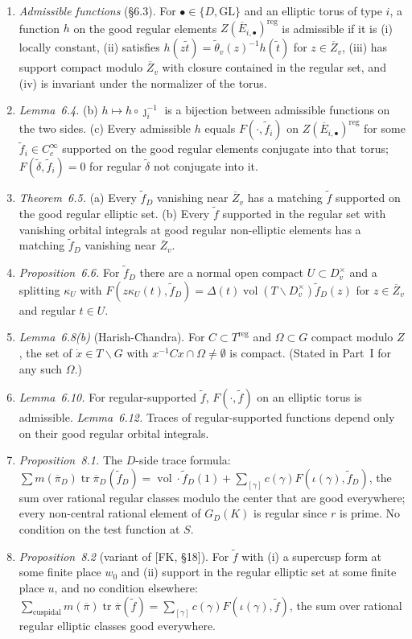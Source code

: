 \documentclass[12pt]{article}
\newcommand{\ov}[1]{\overline{#1}}
\newcommand{\reg}{\mathrm{reg}}
\newcommand{\tr}{\operatorname{tr}}
\newcommand{\vol}{\operatorname{vol}}
\newcommand{\GL}{\mathrm{GL}}
\newcommand{\Zb}{\ov{Z}}
\newcommand{\pib}{\ov{\pi}}
\newcommand{\Eb}{\ov{E}}
\newcommand{\jj}{\jmath}
\theoremstyle{plain}
\theoremstyle{definition}
\begin{document}
\begin{enumerate}[label=(I\arabic*)]
\item \emph{Admissible functions} (\S6.3). For $\bullet\in\{D,\GL\}$ and an elliptic torus of type $i$, a function $h$ on the good regular elements $Z(\Eb_{i,\bullet})^{\reg}$ is admissible if it is (i) locally constant, (ii) satisfies $h(z\tilde t)=\tilde\theta_v(z)^{-1}h(\tilde t)$ for $z\in\Zb_v$, (iii) has support compact modulo $\Zb_v$ with closure contained in the regular set, and (iv) is invariant under the normalizer of the torus.
\item \emph{Lemma~6.4.} (b) $h\mapsto h\circ\jj_i^{-1}$ is a bijection between admissible functions on the two sides. (c) Every admissible $h$ equals $F(\cdot,\tilde f_i)$ on $Z(\Eb_{i,\bullet})^{\reg}$ for some $\tilde f_i\in C_c^\infty$ supported on the good regular elements conjugate into that torus; $F(\tilde\delta,\tilde f_i)=0$ for regular $\tilde\delta$ not conjugate into it.
\item \emph{Theorem~6.5.} (a) Every $\tilde f_D$ vanishing near $\Zb_v$ has a matching $\tilde f$ supported on the good regular elliptic set. (b) Every $\tilde f$ supported in the regular set with vanishing orbital integrals at good regular non-elliptic elements has a matching $\tilde f_D$ vanishing near $\Zb_v$.
\item \emph{Proposition~6.6.} For $\tilde f_D$ there are a normal open compact $U\subset D_v^\times$ and a splitting $\kappa_U$ with $F(z\kappa_U(t),\tilde f_D)=\Delta(t)\vol(T\backslash D_v^\times)\tilde f_D(z)$ for $z\in\Zb_v$ and regular $t\in U$.
\item \emph{Lemma~6.8(b)} (Harish-Chandra). For $C\subset T^{\reg}$ and $\Omega\subset G$ compact modulo $Z$, the set of $\dot x\in T\backslash G$ with $x^{-1}Cx\cap\Omega\ne\emptyset$ is compact. (Stated in Part~I for any such $\Omega$.)
\item \emph{Lemma~6.10.} For regular-supported $\tilde f$, $F(\cdot,\tilde f)$ on an elliptic torus is admissible. \emph{Lemma~6.12.} Traces of regular-supported functions depend only on their good regular orbital integrals.
\item \emph{Proposition~8.1.} The $D$-side trace formula: $\sum m(\pib_D)\tr\pib_D(\tilde f_D)=\vol\cdot\tilde f_D(1)+\sum_{[\gamma]}c(\gamma)F(\iota(\gamma),\tilde f_D)$, the sum over rational regular classes modulo the center that are good everywhere; every non-central rational element of $G_D(K)$ is regular since $r$ is prime. No condition on the test function at $S$.
\item \emph{Proposition~8.2} (variant of [FK, \S18]). For $\tilde f$ with (i) a supercusp form at some finite place $w_0$ and (ii) support in the regular elliptic set at some finite place $u$, and no condition elsewhere: $\sum_{\text{cuspidal}}m(\pib)\tr\pib(\tilde f)=\sum_{[\gamma]}c(\gamma)F(\iota(\gamma),\tilde f)$, the sum over rational regular elliptic classes good everywhere.

\end{enumerate}
\end{document}
